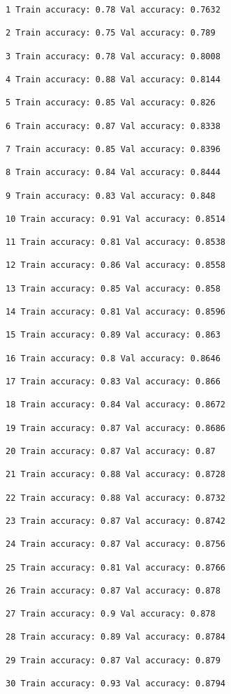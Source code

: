 \documentclass[11pt]{article}
\begin{document}
    \begin{Verbatim}[commandchars=\\\{\}]
1 Train accuracy: 0.78 Val accuracy: 0.7632

2 Train accuracy: 0.75 Val accuracy: 0.789

3 Train accuracy: 0.78 Val accuracy: 0.8008

4 Train accuracy: 0.88 Val accuracy: 0.8144

5 Train accuracy: 0.85 Val accuracy: 0.826

6 Train accuracy: 0.87 Val accuracy: 0.8338

7 Train accuracy: 0.85 Val accuracy: 0.8396

8 Train accuracy: 0.84 Val accuracy: 0.8444

9 Train accuracy: 0.83 Val accuracy: 0.848

10 Train accuracy: 0.91 Val accuracy: 0.8514

11 Train accuracy: 0.81 Val accuracy: 0.8538

12 Train accuracy: 0.86 Val accuracy: 0.8558

13 Train accuracy: 0.85 Val accuracy: 0.858

14 Train accuracy: 0.81 Val accuracy: 0.8596

15 Train accuracy: 0.89 Val accuracy: 0.863

16 Train accuracy: 0.8 Val accuracy: 0.8646

17 Train accuracy: 0.83 Val accuracy: 0.866

18 Train accuracy: 0.84 Val accuracy: 0.8672

19 Train accuracy: 0.87 Val accuracy: 0.8686

20 Train accuracy: 0.87 Val accuracy: 0.87

21 Train accuracy: 0.88 Val accuracy: 0.8728

22 Train accuracy: 0.88 Val accuracy: 0.8732

23 Train accuracy: 0.87 Val accuracy: 0.8742

24 Train accuracy: 0.87 Val accuracy: 0.8756

25 Train accuracy: 0.81 Val accuracy: 0.8766

26 Train accuracy: 0.87 Val accuracy: 0.878

27 Train accuracy: 0.9 Val accuracy: 0.878

28 Train accuracy: 0.89 Val accuracy: 0.8784

29 Train accuracy: 0.87 Val accuracy: 0.879

30 Train accuracy: 0.93 Val accuracy: 0.8794


\end{Verbatim}
\end{document}
